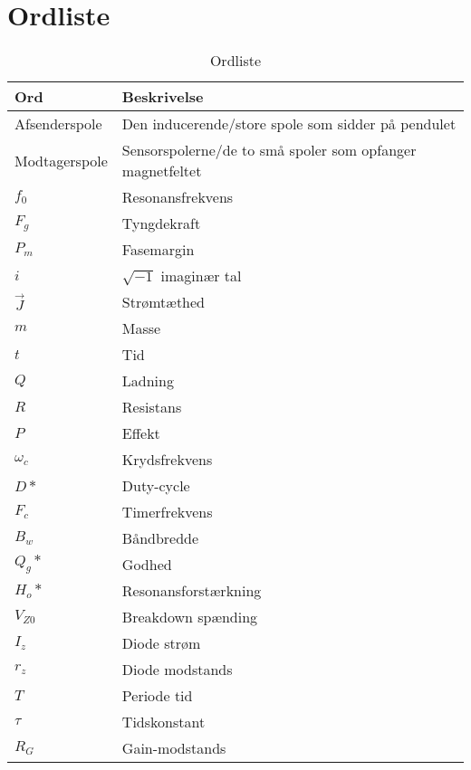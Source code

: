 \chapter{Ordliste} \label{bilag:ordliste}

\begin{table}[h!]
	\centering
	\caption{Ordliste}
	\label{tab:ordliste}
	\begin{threeparttable}
		\begin{tabular}{l l}
			\toprule
			\multicolumn{1}{l}{Ord}       &
			\multicolumn{1}{l}{Beskrivelse}  \\ 
			\midrule
			Afsenderspole					& Den inducerende/store spole som sidder på pendulet		\\
			Modtagerspole					& Sensorspolerne/de to små spoler som opfanger magnetfeltet		\\
			$f_0$				& Resonansfrekvens \\
			$F_g$				& Tyngdekraft	\\
			$P_{m}$				& Fasemargin	\\
			$i$\tnote{*}		& $\sqrt{-1}$ imaginær tal	\\
			$\vec{J}$			& Strømtæthed	\\
			$m$			  		& Masse \\
			$t$			  		& Tid \\
			$Q$					& Ladning \\
			$R$					& Resistans \\
			$P$					& Effekt \\
			$\omega_{c}$		& Krydsfrekvens	\\
			$D*$				& Duty-cycle\\
			$F_c$				& Timerfrekvens\\
			$B_w$				& Båndbredde\\
			$Q_g*$				& Godhed\\
			$H_o*$				& Resonansforstærkning\\
			$V_{Z0}$			& Breakdown spænding\\
			$I_z$				& Diode strøm\\
			$r_z$				& Diode modstands\\
			$T$					& Periode tid\\
			$\tau$				& Tidskonstant\\
			$R_G$				& Gain-modstands\\
			
			\bottomrule
		\end{tabular}
	\end{threeparttable}
\end{table}